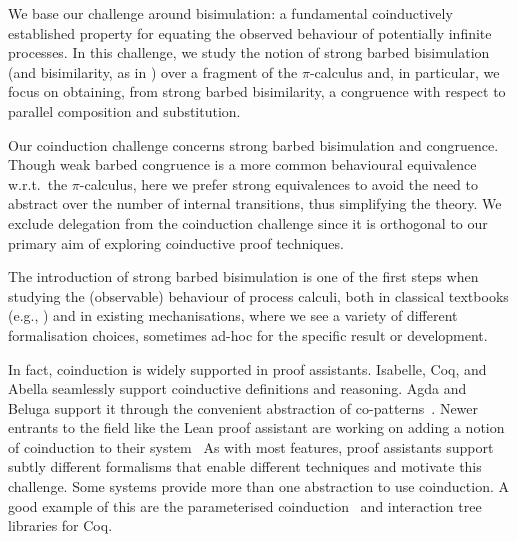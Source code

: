 \documentclass[runningheads]{llncs}
\begin{document}
We base our challenge around bisimulation: a fundamental coinductively
established property for equating the
observed behaviour of potentially infinite processes. 
In this challenge, we study the notion of strong barbed bisimulation
(and bisimilarity, as in \cite{picalcbook})
over a fragment of the $\pi$-calculus and,
in particular, we focus on obtaining,
from strong barbed bisimilarity,
a congruence with respect to
parallel composition and substitution.


Our coinduction challenge concerns strong barbed bisimulation and
congruence.%
Though weak barbed congruence is a more common behavioural equivalence
w.r.t.\ the \(\pi\)-calculus, here we prefer strong equivalences to avoid the
need to abstract over the number of internal transitions, thus
simplifying the theory.  We exclude delegation from the coinduction
challenge since it is orthogonal to our primary aim of exploring
coinductive proof techniques.

The introduction of strong barbed bisimulation is one of the first
steps when studying the (observable) behaviour of process calculi,
both in classical textbooks (e.g., \cite{picalcbook}) and in existing
mechanisations, where we see a variety of different formalisation
choices, sometimes ad-hoc for the specific result or development.

In fact, coinduction is widely supported in proof assistants.
Isabelle, Coq, and Abella seamlessly support coinductive definitions and reasoning.
Agda and Beluga support it through the convenient abstraction of co-patterns~\cite{Abel2013}.
Newer entrants to the field like the Lean proof assistant
are working on adding a notion of coinduction to their system~\cite{Avigad2019}%
%
As with most features, proof assistants support
subtly different formalisms that enable different techniques and motivate this challenge.
Some systems provide more than one abstraction to use coinduction.
A good example of this are the parameterised coinduction~\cite{Hur2013}
and interaction tree~\cite{Xia2019} libraries for Coq.

\end{document}
